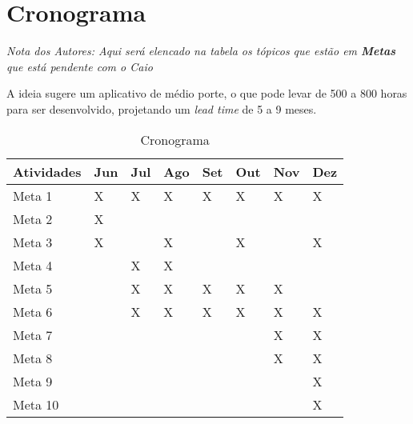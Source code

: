 \chapter[Cronograma]{Cronograma}

\emph{Nota dos Autores: Aqui será elencado na tabela os tópicos que estão em \textbf{Metas} que está pendente com o Caio}


A ideia sugere um aplicativo de médio porte, o que pode levar de 500 a 800 horas para ser desenvolvido, projetando um \textit{lead time} de 5 a 9 meses.



\begin{table}[htb]
  \centering
  \caption[Cronograma]{Cronograma}
  \label{tabCrono}
  \begin{tabular}{llllllll}
    \textbf{Atividades}                    		& \textbf{Jun} & \textbf{Jul} & \textbf{Ago} & \textbf{Set} & \textbf{Out} & \textbf{Nov} & \textbf{Dez} \\
    \hline
    Meta 1                 		& X   & X   & X   & X   & X   & X   & X   \\
    Meta 2  		& X   &     &     &     &     &     &     \\
    Meta 3                  		& X   &     & X   &     & X   &     & X   \\
    Meta 4 	&     & X   & X   &     &     &     &     \\
    Meta 5 	&     & X   & X   & X   & X   & X   &     \\
    Meta 6 			&     & X   & X   & X   & X   & X   & X   \\
    Meta 7 			&     &     &     &     &     & X   & X   \\
    Meta 8 			&     &     &     &     &     & X   & X   \\
    Meta 9 			&     &     &     &     &     &     & X   \\
    Meta 10 		&     &     &     &     &     &     & X   \\
    \hline
  \end{tabular}
\end{table}


%
%
%
%
